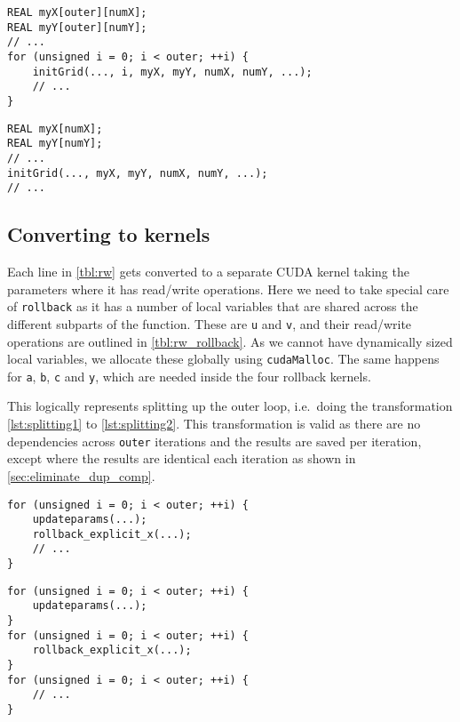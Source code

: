 \documentclass[a4paper]{article}
\begin{document}
\begin{lstlisting}[caption={bla bla},label={lst:duplicate1}]
REAL myX[outer][numX];
REAL myY[outer][numY];
// ...
for (unsigned i = 0; i < outer; ++i) {
    initGrid(..., i, myX, myY, numX, numY, ...);
    // ...
}
\end{lstlisting}
\begin{lstlisting}[caption={bla bla},label={lst:duplicate2}]
REAL myX[numX];
REAL myY[numY];
// ...
initGrid(..., myX, myY, numX, numY, ...);
// ...
\end{lstlisting}

\subsection{Converting to kernels}

Each line in \autoref{tbl:rw} gets converted to a separate CUDA kernel taking
the parameters where it has read/write operations. Here we need to take special
care of \texttt{rollback} as it has a number of local variables that are shared
across the different subparts of the function. These are \texttt{u} and
\texttt{v}, and their read/write operations are outlined in
\autoref{tbl:rw_rollback}. As we cannot have dynamically sized local variables,
we allocate these globally using \texttt{cudaMalloc}. The same happens for
\texttt{a}, \texttt{b}, \texttt{c} and \texttt{y}, which are needed inside the
four rollback kernels.

This logically represents splitting up the outer loop, i.e.\ doing the
transformation \autoref{lst:splitting1} to \autoref{lst:splitting2}. This
transformation is valid as there are no dependencies across \texttt{outer}
iterations and the results are saved per iteration, except where the results
are identical each iteration as shown in \autoref{sec:eliminate_dup_comp}.

\begin{lstlisting}[caption={bla bla},label={lst:splitting1}]
for (unsigned i = 0; i < outer; ++i) {
    updateparams(...);
    rollback_explicit_x(...);
    // ...
}
\end{lstlisting}
\begin{lstlisting}[caption={bla bla},label={lst:splitting2}]
for (unsigned i = 0; i < outer; ++i) {
    updateparams(...);
}
for (unsigned i = 0; i < outer; ++i) {
    rollback_explicit_x(...);
}
for (unsigned i = 0; i < outer; ++i) {
    // ...
}
\end{lstlisting}
\end{document}
